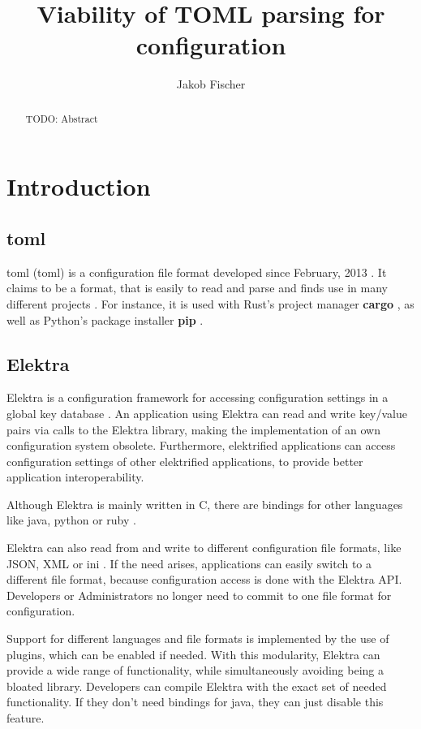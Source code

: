 \documentclass[12pt]{report}
\title{Viability of TOML parsing for configuration}
\author{Jakob Fischer}
\begin{document}
\maketitle

\begin{abstract}
TODO: Abstract
\end{abstract}

\chapter{Introduction}


\section{\acrshort{toml}}
\acrlong{toml} (\acrshort{toml}) is a configuration file format developed since February, 2013 \cite{tomlcontrib}.
It claims to be a format, that is easily to read and parse \cite{tomlreadme} and finds use in many different projects \cite{tomlwiki}.
For instance, it is used with Rust's project manager \textbf{cargo} \cite{cargogit}, as well as Python's package installer \textbf{pip} \cite{piprefguide}.

\section{Elektra}
Elektra is a configuration framework for accessing configuration settings in a global key database \cite{Elektramain}.
An application using Elektra can read and write key/value pairs via calls to the Elektra library, making the implementation of an own configuration system obsolete.
Furthermore, elektrified applications can access configuration settings of other elektrified applications, to provide better application interoperability.

Although Elektra is mainly written in C, there are bindings for other languages like java, python or ruby \cite{Elektrabindings}.

Elektra can also read from and write to different configuration file formats, like JSON, XML or ini \cite{Elektrastorage}.
If the need arises, applications can easily switch to a different file format, because configuration access is done with the Elektra API.
Developers or Administrators no longer need to commit to one file format for configuration.

Support for different languages and file formats is implemented by the use of plugins, which can be enabled if needed.
With this modularity, Elektra can provide a wide range of functionality, while simultaneously avoiding being a bloated library.
Developers can compile Elektra with the exact set of needed functionality. If they don't need bindings for java, they can just disable this feature.
\end{document}
